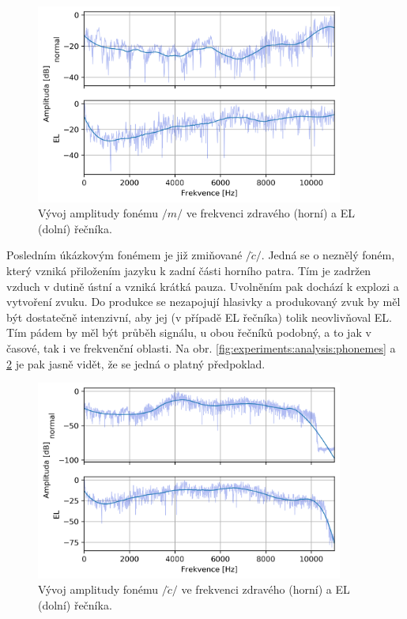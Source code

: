 \begin{figure}[hbpt]
  \centering
  \includegraphics[width=0.9\textwidth]{./ch4-experiments/img/freq_analysis_(m).png}
  \caption{Vývoj amplitudy fonému $/m/$ ve frekvenci zdravého (horní) a EL (dolní) řečníka.}
  \label{fig:experiments:analysis:freq:m}
\end{figure}

Posledním úkázkovým fonémem je již zmiňované $/\check{c}/$. Jedná se o neznělý foném, který vzniká přiložením jazyku k zadní části horního patra. Tím je zadržen vzduch v dutině ústní a vzniká krátká pauza. Uvolněním pak dochází k explozi a vytvoření zvuku. Do produkce se nezapojují hlasivky a produkovaný zvuk by měl být dostatečně intenzivní, aby jej (v případě EL řečníka) tolik neovlivňoval EL. Tím pádem by měl být průběh signálu, u obou řečníků podobný, a to jak v časové, tak i ve frekvenční oblasti. Na obr. \ref{fig:experiments:analysis:phonemes} a \ref{fig:experiments:analysis:freq:c} je pak jasně vidět, že se jedná o platný předpoklad.

\begin{figure}[hbpt]
  \centering
  \includegraphics[width=0.9\textwidth]{./ch4-experiments/img/freq_analysis_(c).png}
  \caption{Vývoj amplitudy fonému $/\check{c}/$ ve frekvenci zdravého (horní) a EL (dolní) řečníka.}
  \label{fig:experiments:analysis:freq:c}
\end{figure}

